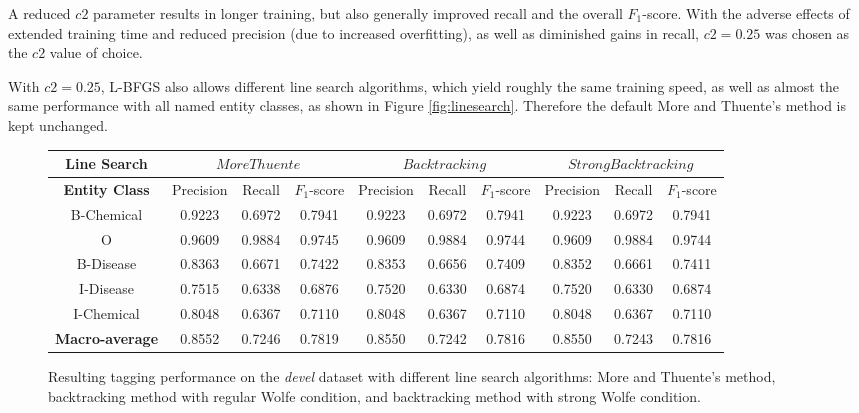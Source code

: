 \documentclass[10pt, oneside]{article}
\begin{document}
A reduced $c2$ parameter results in longer training, but also generally improved recall and the overall $F_1$-score. With the adverse effects of extended training time and reduced precision (due to increased overfitting), as well as diminished gains in recall, $c2=0.25$ was chosen as the $c2$ value of choice.

With $c2=0.25$, L-BFGS also allows different line search algorithms, which yield roughly the same training speed, as well as almost the same performance with all named entity classes, as shown in Figure \ref{fig:linesearch}. Therefore the default More and Thuente's method is kept unchanged.

\begin{figure}[h]
\begin{center}
\fontsize{9}{11}\selectfont
\begin{tabular}{|*{10}{c|}}\hline
\textbf{Line Search}  & \multicolumn{3}{c|}{$MoreThuente$} & \multicolumn{3}{c|}{$Backtracking$} & \multicolumn{3}{c|}{$StrongBacktracking$}  \\ \hline 
\textbf{Entity Class} & Precision & Recall & $F_1$-score & Precision & Recall & $F_1$-score & Precision & Recall & $F_1$-score \\ \hline
B-Chemical & 0.9223 & 0.6972 & 0.7941 & 0.9223 & 0.6972 & 0.7941 & 0.9223 & 0.6972 & 0.7941 \\ \hline
O                 & 0.9609 & 0.9884 & 0.9745 & 0.9609 & 0.9884 & 0.9744 & 0.9609 & 0.9884 & 0.9744 \\ \hline
B-Disease   & 0.8363 & 0.6671 & 0.7422 & 0.8353 & 0.6656 & 0.7409 & 0.8352 & 0.6661 & 0.7411 \\ \hline
I-Disease    & 0.7515 & 0.6338 & 0.6876 & 0.7520 & 0.6330 & 0.6874 & 0.7520 & 0.6330 & 0.6874 \\ \hline
I-Chemical  & 0.8048 & 0.6367 & 0.7110 & 0.8048 & 0.6367 & 0.7110 & 0.8048 & 0.6367 & 0.7110 \\ \hline
\textbf{Macro-average} & 0.8552 & 0.7246 & 0.7819 & 0.8550 & 0.7242 & 0.7816 & 0.8550 & 0.7243 & 0.7816 \\ \hline
\end{tabular}
\caption{\label{fig:trigrams} Resulting tagging performance on the \emph{devel} dataset with different line search algorithms: More and Thuente's method, backtracking method with regular Wolfe condition, and backtracking method with strong Wolfe condition.}
\end{center}
\end{figure}




\footnotesize{}
\end{document}
